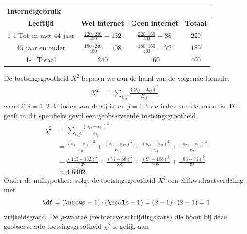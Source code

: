 \begin{enumerate}[label=(\alph*)]
{\begin{center}
            \renewcommand{\arraystretch}{1.5}
            \begin{tabular}{cccc}
                \multicolumn{4}{l}{Internetgebruik} \\
                \toprule
                    {\bfseries Leeftijd} & {\bfseries Wel internet} & {\bfseries Geen internet} & {\bfseries Totaal} \\
                \cmidrule{1-1} \cmidrule{2-2} \cmidrule{3-3} \cmidrule{4-4}
                    Tot en met $44$ jaar & $\frac{220\cdot 240}{400}=132$ & $\frac{220\cdot 160}{400}=88$ & $220$ \\
                    $45$ jaar en ouder & $\frac{180\cdot 240}{400}=108$ & $\frac{180\cdot 160}{400}=72$ & $180$ \\
                \cmidrule{1-1} \cmidrule{2-2} \cmidrule{3-3} \cmidrule{4-4}
                    Totaal & $240$ & $160$ & $400$ \\
                \bottomrule
            \end{tabular}
        \end{center}
        De toetsingsgrootheid $X^2$ bepalen we aan de hand van de volgende formule:
        \begin{align*}
            X^2  &= \sum_{i,j} \frac{(O_{ij} - E_{ij})^2}{E_{ij}},
        \end{align*}
        waarbij $i = 1, 2$ de index van de rij is, en $j = 1, 2$ de index van de kolom is.
        Dit geeft in dit specifieke geval een geobserveerde toetsingsgrootheid 
        \begin{align*}
            \chi^2  &= \sum_{i,j} \frac{(o_{ij} - e_{ij})^2}{e_{ij}} \\
                    &=\frac{(o_{11} - e_{11})^2}{e_{11}} + \frac{(o_{12} - e_{12})^2}{E_{12}} + \frac{(o_{21} - e_{21})^2}{e_{21}} + \frac{(o_{22} - e_{22})^2}{e_{22}} \\
                    &= \frac{(143 - 132)^2}{132} + \frac{(77 - 88)^2}{88} + \frac{(97 - 108)^2}{108} + \frac{(83-72)^2}{72}\\
                    &\approx 4.6402.
        \end{align*}
        Onder de nulhypothese volgt de toetsingsgrootheid $X^2$ een chikwadraatverdeling met
        \[
            \df = (\nrows-1) \cdot (\ncols-1) = (2-1)\cdot(2-1) = 1
        \]
        vrijheidsgraad.
        De $p$-waarde (rechteroverschrijdingskans) die hoort bij deze geobserveerde toetsingsgrootheid $\chi^2$ is gelijk aan
        \begin{align*}

\end{align*}}
\end{enumerate}

